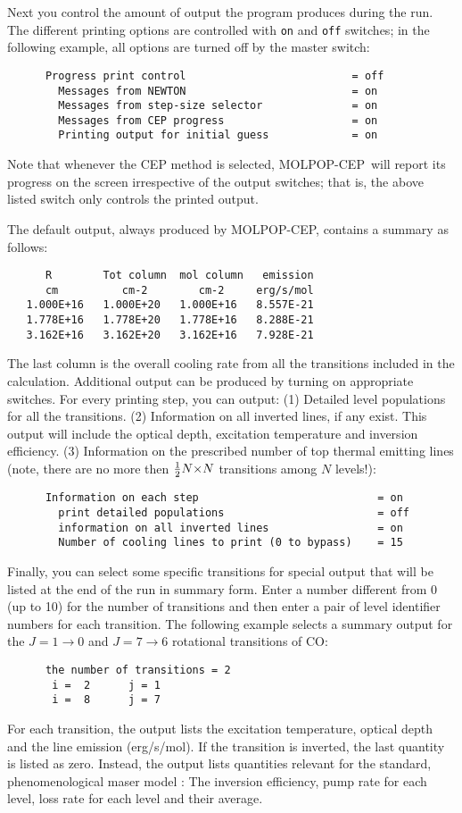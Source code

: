 \documentclass[12pt]{article}
\def\x        {\hbox{$\times$}}
\def\half     {\hbox{$1\over2$}}
\def\M{MOLPOP-CEP}
\begin{document}
Next you control the amount of output the program produces during the run. The
different printing options are controlled with {\tt on} and {\tt off} switches;
in the following example, all options are turned off by the master switch:
\begin{verbatim}
      Progress print control                          = off
        Messages from NEWTON                          = on
        Messages from step-size selector              = on
        Messages from CEP progress                    = on
        Printing output for initial guess             = on
\end{verbatim}
Note that whenever the CEP method is selected, \M\ will report its progress on
the screen irrespective of the output switches; that is, the above listed
switch only controls the printed output.

The default output, always produced by \M, contains a summary as follows:
\begin{verbatim}
      R        Tot column  mol column   emission
      cm          cm-2        cm-2     erg/s/mol
   1.000E+16   1.000E+20   1.000E+16   8.557E-21
   1.778E+16   1.778E+20   1.778E+16   8.288E-21
   3.162E+16   3.162E+20   3.162E+16   7.928E-21
\end{verbatim}
The last column is the overall cooling rate from all the transitions included
in the calculation. Additional output can be produced by turning on appropriate
switches. For every printing step, you can output: (1) Detailed level
populations for all the transitions. (2) Information on all inverted lines, if
any exist. This output will include the optical depth, excitation temperature
and inversion efficiency. (3) Information on the prescribed number of top
thermal emitting lines (note, there are no more then $\half N\x N$ transitions
among $N$ levels!):
\begin{verbatim}
      Information on each step                            = on
        print detailed populations                        = off
        information on all inverted lines                 = on
        Number of cooling lines to print (0 to bypass)    = 15
\end{verbatim}
Finally, you can select some specific transitions for special output that will
be listed at the end of the run in summary form. Enter a number different from
0 (up to 10) for the number of transitions and then enter a pair of level
identifier numbers for each transition.  The following example selects a
summary output for the $J = 1 \to 0$ and $J = 7 \to 6$ rotational transitions
of CO:
\begin{verbatim}
      the number of transitions = 2
       i =  2      j = 1
       i =  8      j = 7
\end{verbatim}
For each transition, the output lists the excitation temperature, optical depth
and the line emission (erg/s/mol). If the transition is inverted, the last
quantity is listed as zero. Instead, the output lists quantities relevant for
the standard, phenomenological maser model \citep[see][]{elitzur92}: The
inversion efficiency, pump rate for each level, loss rate for each level and
their average.
\end{document}
